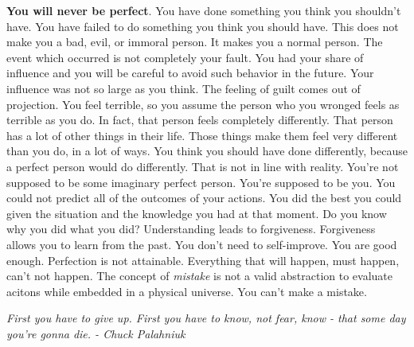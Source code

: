 \documentclass[a4paper,hidelinks]{article}
\begin{document}
\textbf{You will never be perfect}.
You have done something you think you shouldn't have.
You have failed to do something you think you should have.
This does not make you a bad, evil, or immoral person.
It makes you a normal person.
The event which occurred is not completely your fault.
You had your share of influence and you will be careful to avoid such behavior in the future.
Your influence was not so large as you think.
The feeling of guilt comes out of projection.
You feel terrible, so you assume the person who you wronged feels as terrible as you do.
In fact, that person feels completely differently.
That person has a lot of other things in their life.
Those things make them feel very different than you do, in a lot of ways.
You think you should have done differently, because a perfect person would do differently.
That is not in line with reality.
You're not supposed to be some imaginary perfect person.
You're supposed to be you.
You could not predict all of the outcomes of your actions.
You did the best you could given the situation and the knowledge you had at that moment.
Do you know why you did what you did?
Understanding leads to forgiveness.
Forgiveness allows you to learn from the past.
You don't need to self-improve.
You are good enough.
Perfection is not attainable.
Everything that will happen, must happen, can't not happen.
The concept of \textit{mistake} is not a valid abstraction to evaluate acitons while embedded in a physical universe.
You can't make a mistake.


\newpage

\begin{center}
\textit{
First you have to give up. First you have to know, not fear, know - that some day you’re gonna die. - Chuck Palahniuk
}
\end{center}
\end{document}
